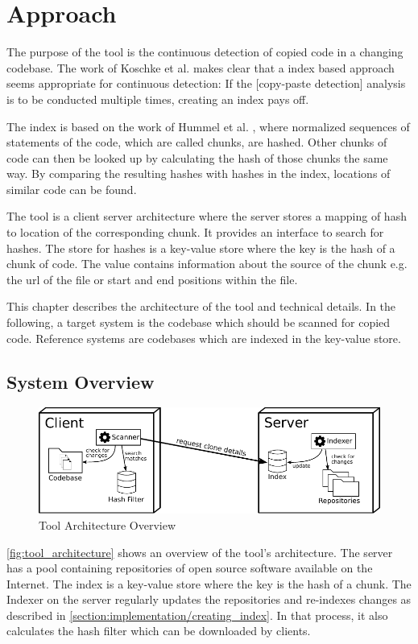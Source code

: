 

\chapter{Approach}\label{chapter:approach}
The purpose of the tool is the continuous detection of copied code in a changing codebase.
The work of Koschke et al. makes clear that a index based approach seems appropriate for continuous detection:
\glqq If the [copy-paste detection] analysis is to be conducted multiple times, creating an index pays off\grqq \cite{koschke2014large}.

The index is based on the work of Hummel et al. \cite{hummel2010index}, where normalized sequences of statements of the code, which are called chunks, are hashed.
Other chunks of code can then be looked up by calculating the hash of those chunks the same way.
By comparing the resulting hashes with hashes in the index, locations of similar code can be found.

The tool is a client server architecture where the server stores a mapping of hash to location of the corresponding chunk.
It provides an interface to search for hashes.
The store for hashes is a key-value store where the key is the hash of a chunk of code.
The value contains information about the source of the chunk e.g. the url of the file or start and end positions within the file.

This chapter describes the architecture of the tool and technical details.
In the following, a target system is the codebase which should be scanned for copied code.
Reference systems are codebases which are indexed in the key-value store.

\section{System Overview}
\begin{figure}[h]
	\includegraphics{figures/architecture_overview.pdf}
	\caption{Tool Architecture Overview}\label{fig:tool_architecture}
\end{figure}
\autoref{fig:tool_architecture} shows an overview of the tool's architecture.
The server has a pool containing repositories of open source software available on the Internet.
The index is a key-value store where the key is the hash of a chunk.
The Indexer on the server regularly updates the repositories and re-indexes changes as described in \ref{section:implementation/creating_index}.
In that process, it also calculates the hash filter which can be downloaded by clients.

